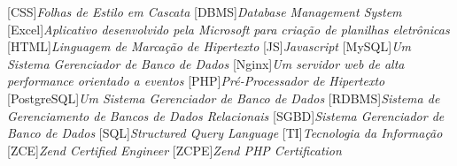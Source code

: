
[CSS]{\textit{Folhas de Estilo em Cascata}}
[DBMS]{\textit{Database Management System}}
[Excel]{\textit{Aplicativo desenvolvido pela Microsoft para
criação de planilhas eletrônicas}}
[HTML]{\textit{Linguagem de Marcação de Hipertexto}}
[JS]{\textit{Javascript}}
[MySQL]{\textit{Um Sistema Gerenciador de Banco de Dados}}
[Nginx]{\textit{Um servidor web de alta performance orientado a
eventos}}
[PHP]{\textit{Pré-Processador de Hipertexto}}
[PostgreSQL]{\textit{Um Sistema Gerenciador de Banco de Dados}}
[RDBMS]{\textit{Sistema de Gerenciamento de Bancos de Dados
Relacionais}}
[SGBD]{\textit{Sistema Gerenciador de Banco de Dados}}
[SQL]{\textit{Structured Query Language}}
[TI]{\textit{Tecnologia da Informação}}
[ZCE]{\textit{Zend Certified Engineer}}
[ZCPE]{\textit{Zend PHP Certification}}